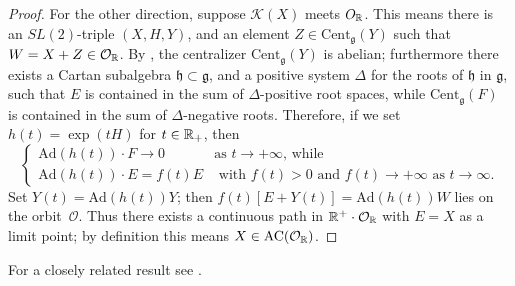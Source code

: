\documentclass{article}
\theoremstyle{definition}
\numberwithin{equation}{section}
\renewcommand{\-}{\hyp{}}
\newcommand{\g}{\mathfrak g}
\renewcommand{\O}{\mathcal O}
\newcommand{\K}{\mathcal K}
\newcommand{\Cent}{\mathrm{Cent}}
\newcommand{\AC}{\mathrm{AC}}
\begin{document}
\begin{proof}
For the other direction, suppose $\K(X)$ meets $\mathcal \O_\R$.
This means there is an $SL(2)$-triple $(X,H,Y)$, and an element $Z\in \Cent_\g(Y)$ such that $W=X+Z \in \O_\R$. 
By \cite{Kostant59}, the centralizer  $\mathrm{Cent}_{\g}(Y)$ is abelian; furthermore there exists a Cartan subalgebra $\mathfrak{h} \subset \g$, and a positive system $\Delta$ for the roots of $\mathfrak{h}$ in $\g$, such that $E$ is contained in the sum of $\Delta$-positive root spaces, while $\mathrm{Cent}_{\g}(F)$ is contained in the sum of $\Delta$-negative roots.  Therefore, if we set $h(t) = \exp(tH)$ for $t \in \mathbb{R}_+$, then 
\[\begin{cases} \mathrm{Ad}(h(t)) \cdot F \longrightarrow 0 & \text{as $t \to +\infty$, while} \\
 \mathrm{Ad}(h(t)) \cdot E = f(t) E & \text{ with $f(t) >0$ and $f(t)\to +\infty$ as $t \to \infty$.}\end{cases}\]
Set $Y(t) = \mathrm{Ad}(h(t)) Y$; then $f(t) \left[ E + Y(t) \right] = \mathrm{Ad}(h(t)) W$ lies on the orbit~$\O$. Thus there exists a continuous path in $\R^+ \cdot \O_\R$ with $E=X$ as a limit point; by definition this means $X \in \AC(\O_\R)$.
\end{proof}

For a closely related result see \cite[Proposition 3.5]{fm}.
  
\end{document}

